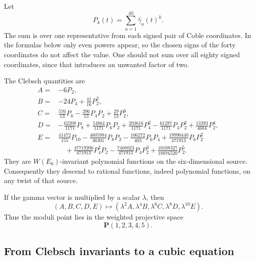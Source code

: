 \documentclass[11pt]{article}
\newcommand{\PP}{\mathbf{P}}
\newcommand{\gamhat}{\widehat{\gamma}}
\begin{document}
Let
\[
  P_k(t)=\sum_{a=1}^{40}\gamhat_a(t)^k.
\]
The sum is over one representative from each signed pair of Coble coordinates.  In
the formulas below only even powers appear, so the chosen signs of the forty
coordinates do not affect the value.  One should not sum over all eighty signed
coordinates, since that introduces an unwanted factor of two.

The Clebsch quantities are
\begin{align}
 A={}&-6P_2,\nonumber\\
 B={}&-24P_4+\frac{41}{16}P_2^2,\nonumber\\
 C={}&\frac{576}{13}P_6-\frac{396}{13}P_4P_2
       +\frac{29}{13}P_2^3,\nonumber\\
 D={}&-\frac{62208}{1171}P_8
       +\frac{54864}{1171}P_6P_2
       +\frac{203616}{1171}P_4^2
       -\frac{61287}{1171}P_4P_2^2
       +\frac{13393}{4684}P_2^4,\nonumber\\
 E={}&\frac{41472}{155}P_{10}
       -\frac{4605984}{36301}P_8P_2
       -\frac{106272}{403}P_6P_4
       +\frac{19990440}{471913}P_6P_2^2 \nonumber\\
   &\quad
       +\frac{47719206}{471913}P_4^2P_2
       -\frac{7468023}{471913}P_4P_2^3
       +\frac{10108327}{18876520}P_2^5.
       \label{eq:clebsch}
\end{align}
They are $W(E_6)$-invariant polynomial functions on the six-dimensional source.
Consequently they descend to rational functions, indeed polynomial functions, on
any twist of that source.

If the gamma vector is multiplied by a scalar $\lambda$, then
\[
  (A,B,C,D,E)\mapsto
  (\lambda^2A,\lambda^4B,\lambda^6C,\lambda^8D,\lambda^{10}E).
\]
Thus the moduli point lies in the weighted projective space
\[
  \PP(1,2,3,4,5).
\]

\subsection{From Clebsch invariants to a cubic equation}
\end{document}
